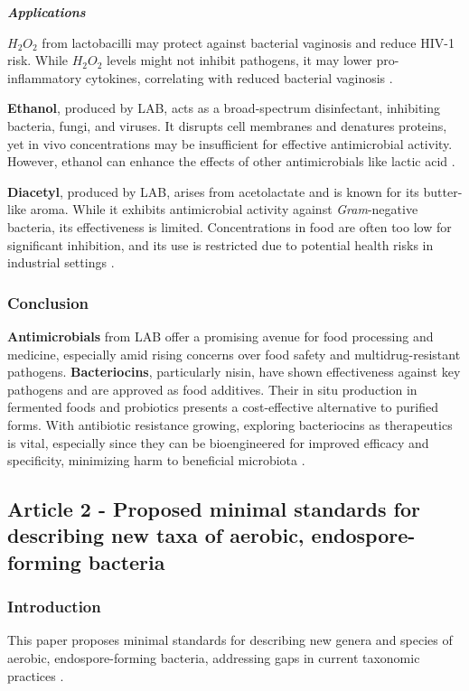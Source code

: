 \vspace{0.5em}
\textbf{\textit{Applications}}
\vspace{0.5em}

\textbf{$H_2O_2$} from lactobacilli may protect against bacterial vaginosis and reduce HIV-1 risk. While $H_2O_2$ levels might not inhibit pathogens, it may lower pro-inflammatory cytokines, correlating with reduced bacterial vaginosis \cite*{L10-MicroFunct}.

\textbf{Ethanol}, produced by LAB, acts as a broad-spectrum disinfectant, inhibiting bacteria, fungi, and viruses. It disrupts cell membranes and denatures proteins, yet in vivo concentrations may be insufficient for effective antimicrobial activity. However, ethanol can enhance the effects of other antimicrobials like lactic acid \cite*{L10-MicroFunct}.

\textbf{Diacetyl}, produced by LAB, arises from acetolactate and is known for its butter-like aroma. While it exhibits antimicrobial activity against \textit{Gram}-negative bacteria, its effectiveness is limited. Concentrations in food are often too low for significant inhibition, and its use is restricted due to potential health risks in industrial settings \cite*{L10-MicroFunct}.

\subsubsection*{Conclusion} 
\textbf{Antimicrobials} from LAB offer a promising avenue for food processing and medicine, especially amid rising concerns over food safety and multidrug-resistant pathogens. \textbf{Bacteriocins}, particularly nisin, have shown effectiveness against key pathogens and are approved as food additives. Their in situ production in fermented foods and probiotics presents a cost-effective alternative to purified forms. With antibiotic resistance growing, exploring bacteriocins as therapeutics is vital, especially since they can be bioengineered for improved efficacy and specificity, minimizing harm to beneficial microbiota \cite*{L10-MicroFunct}.

\subsection{Article 2 - Proposed minimal standards for describing new taxa of aerobic, endospore-forming bacteria}
\subsubsection*{Introduction}
This paper proposes minimal standards for describing new genera and species of aerobic, endospore-forming bacteria, addressing gaps in current taxonomic practices \cite*{L10-PropMin}.

